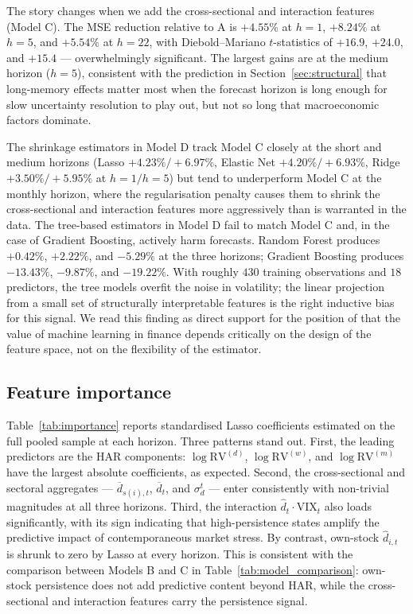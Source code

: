 \documentclass[11pt,a4paper]{article}
\newcommand{\RV}{\mathrm{RV}}
\newcommand{\VIX}{\mathrm{VIX}}
\newcommand{\dhat}{\hat d}
\begin{document}


The story changes when we add the cross-sectional and interaction
features (Model C). The MSE reduction relative to A is $+4.55\%$ at
$h=1$, $+8.24\%$ at $h=5$, and $+5.54\%$ at $h=22$, with
Diebold--Mariano $t$-statistics of $+16.9$, $+24.0$, and $+15.4$ ---
overwhelmingly significant. The largest gains are at the medium horizon
($h=5$), consistent with the prediction in
Section~\ref{sec:structural} that long-memory effects matter most when
the forecast horizon is long enough for slow uncertainty resolution to
play out, but not so long that macroeconomic factors dominate.

The shrinkage estimators in Model D track Model C closely at the short
and medium horizons (Lasso $+4.23\%/+6.97\%$, Elastic Net
$+4.20\%/+6.93\%$, Ridge $+3.50\%/+5.95\%$ at $h=1/h=5$) but tend to
underperform Model C at the monthly horizon, where the regularisation
penalty causes them to shrink the cross-sectional and interaction
features more aggressively than is warranted in the data. The
tree-based estimators in Model D fail to match Model C and, in the case
of Gradient Boosting, actively harm forecasts. Random Forest produces
$+0.42\%$, $+2.22\%$, and $-5.29\%$ at the three horizons; Gradient
Boosting produces $-13.43\%$, $-9.87\%$, and $-19.22\%$. With roughly
$430$ training observations and $18$ predictors, the tree models
overfit the noise in volatility; the linear projection from a small set
of structurally interpretable features is the right inductive bias for
this signal. We read this finding as direct support for the position of
\citet{gu2020empirical} that the value of machine learning in finance
depends critically on the design of the feature space, not on the
flexibility of the estimator.

\subsection{Feature importance}

Table~\ref{tab:importance} reports standardised Lasso coefficients
estimated on the full pooled sample at each horizon. Three patterns
stand out. First, the leading predictors are the HAR components:
$\log\RV^{(d)}$, $\log\RV^{(w)}$, and $\log\RV^{(m)}$ have the largest
absolute coefficients, as expected. Second, the cross-sectional and
sectoral aggregates --- $\overline d_{s(i),t}$, $\overline d_t$, and
$\sigma_d^t$ --- enter consistently with non-trivial magnitudes at all
three horizons. Third, the interaction $\dhat_t\!\cdot\!\VIX_t$ also
loads significantly, with its sign indicating that high-persistence
states amplify the predictive impact of contemporaneous market stress.
By contrast, own-stock $\dhat_{i,t}$ is shrunk to zero by Lasso at every
horizon. This is consistent with the comparison between Models B and C
in Table~\ref{tab:model_comparison}: own-stock persistence does not
add predictive content beyond HAR, while the cross-sectional and
interaction features carry the persistence signal.
\end{document}
